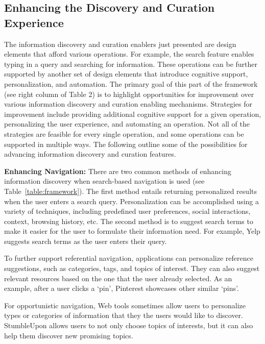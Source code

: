 \documentclass{sigchi}
\newcommand{\feature}[1]{{\ttfamily#1}}
\begin{document}
{%

{\subsection{Enhancing the Discovery and Curation Experience}


The information discovery and curation enablers just presented are design elements that afford various operations. For example, the search feature enables typing in a query and searching for information. These operations can be further supported by another set of design elements that introduce cognitive support, personalization, and automation. The primary goal of this part of the framework (see right column of Table 2) is to highlight opportunities for improvement over various information discovery and curation enabling mechanisms.
%
Strategies for improvement include providing additional cognitive support for a given operation, personalizing the user experience, and automating an operation. Not all of the strategies are feasible for every single operation, and some operations can be supported in multiple ways. The following  outline some of the possibilities for advancing information discovery and curation features. 

{\textbf{Enhancing Navigation:}
There are two common methods of enhancing information discovery when search-based navigation is used (see Table~\ref{table:framework}). The first method entails returning personalized results when the user enters a search query. \feature{Personalization} can be accomplished using a variety of techniques, including predefined user preferences, social interactions, context, browsing history, etc. The second method is to \feature{suggest search terms} to make it easier for the user to formulate their information need. For example, Yelp suggests search terms as the user enters their query.

To further support referential navigation, applications can \feature{personalize} reference suggestions, such as \feature{categories}, \feature{tags}, and \feature{topics} of interest. They can also suggest relevant resources based on the one that the user already selected. As an example, after a user clicks a `pin', Pinterest showcases other similar `pins'.

For opportunistic navigation, Web tools sometimes allow users to \feature{personalize} types or categories of information that they the users would like to discover. StumbleUpon allows users to not only choose topics of interests, but it can also help them discover new promising topics.


}}}
\end{document}
